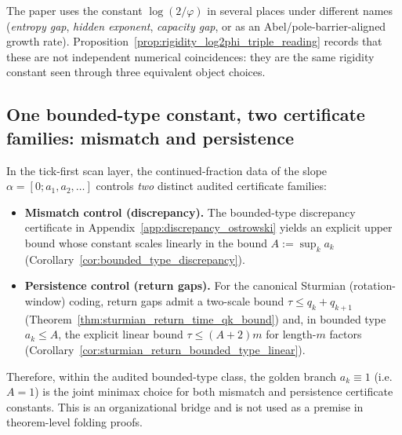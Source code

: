 \begin{remark}\label{rem:rigidity_log2phi_why}
\AuditTag The paper uses the constant $\log(2/\varphi)$ in several places under different names
(\emph{entropy gap}, \emph{hidden exponent}, \emph{capacity gap}, or as an Abel/pole-barrier-aligned growth rate).
Proposition~\ref{prop:rigidity_log2phi_triple_reading} records that these are not independent numerical coincidences:
they are the same rigidity constant seen through three equivalent object choices.
\end{remark}

\subsection{One bounded-type constant, two certificate families: mismatch and persistence}
\label{subsec:rigidity_bounded_type_joint_minimax}

\begin{remark}\label{rem:rigidity_joint_minimax_golden_branch}
\AuditTag In the tick-first scan layer, the continued-fraction data of the slope $\alpha=[0;a_1,a_2,\ldots]$ controls \emph{two} distinct audited certificate families:
\begin{itemize}
\item \textbf{Mismatch control (discrepancy).}
The bounded-type discrepancy certificate in Appendix~\ref{app:discrepancy_ostrowski} yields an explicit upper bound whose constant scales linearly in the bound $A:=\sup_k a_k$ (Corollary~\ref{cor:bounded_type_discrepancy}).
\item \textbf{Persistence control (return gaps).}
For the canonical Sturmian (rotation-window) coding, return gaps admit a two-scale bound $\tau\le q_k+q_{k+1}$ (Theorem~\ref{thm:sturmian_return_time_qk_bound}) and, in bounded type $a_k\le A$, the explicit linear bound $\tau\le (A+2)m$ for length-$m$ factors (Corollary~\ref{cor:sturmian_return_bounded_type_linear}).
\end{itemize}
\AuditTag Therefore, within the audited bounded-type class, the golden branch $a_k\equiv 1$ (i.e.\ $A=1$) is the joint minimax choice for both mismatch and persistence certificate constants.
This is an organizational bridge and is not used as a premise in theorem-level folding proofs.
\end{remark}

